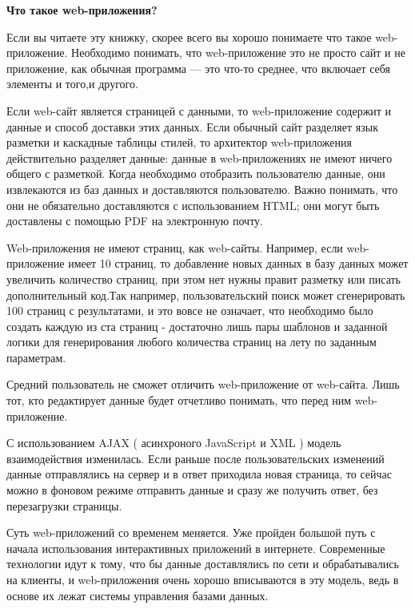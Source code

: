 %

\textbf{Что такое web-приложения?}


Если вы читаете эту книжку, скорее всего вы хорошо понимаете что такое web-приложение. Необходимо понимать, что web-приложение это не просто сайт и не приложение, как обычная программа --- это что-то среднее, что включает себя элементы и того,и другого.

Если web-сайт является страницей с данными, то web-приложение содержит и данные и способ доставки этих данных. Если обычный сайт разделяет язык разметки и каскадные таблицы стилей, то архитектор web-приложения действительно разделяет данные: данные в web-приложениях не имеют ничего общего с разметкой. Когда необходимо отобразить пользователю данные, они извлекаются из баз данных и доставляются пользователю. Важно понимать, что они не обязательно доставляются с использованием HTML;  они могут быть доставлены с помощью PDF на электронную почту.

Web-приложения не имеют страниц, как web-сайты. Например, если web-приложение имеет 10 страниц, то добавление новых данных в базу данных может увеличить количество страниц, при этом нет нужны правит разметку или писать дополнительный код.Так например, пользовательский поиск может сгенерировать 100 страниц с результатами, и это вовсе не означает, что необходимо было создать каждую из ста страниц - достаточно лишь пары шаблонов и заданной логики для генерирования любого количества страниц на лету по заданным параметрам.

Средний пользователь не сможет отличить web-приложение от web-сайта. Лишь тот, кто редактирует данные будет отчетливо понимать, что перед ним web-приложение.

С использованием AJAX ( асинхроного JavaScript и XML ) модель взаимодействия изменилась. Если раньше после пользовательских изменений данные отправлялись на сервер и в ответ приходила новая страница, то сейчас можно в фоновом режиме отправить данные и сразу же получить ответ, без перезагрузки страницы.

Суть web-приложений со временем меняется. Уже пройден большой путь с начала использования интерактивных приложений в интернете. Современные технологии идут к тому, что бы данные доставлялись по сети и обрабатывались на клиенты, и web-приложения очень хорошо вписываются в эту модель, ведь в основе их лежат системы управления базами данных.


